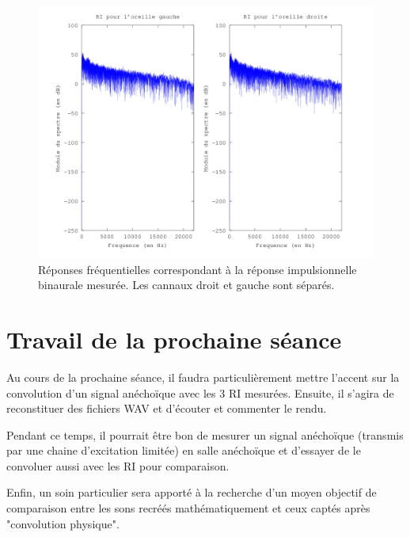 \documentclass[12pt]{article}
\begin{document}
\begin{figure}[h]
    \vfill\begin{center}
        \includegraphics[scale=0.6]{ri_binaurale.png}
    \end{center}\vfill
    \caption{\label{spectre2} Réponses fréquentielles correspondant à la réponse impulsionnelle binaurale mesurée. Les
    cannaux droit et gauche sont séparés.}
\end{figure}

\section{Travail de la prochaine séance} %

Au cours de la prochaine séance, il faudra particulièrement mettre l'accent sur la convolution d'un signal anéchoïque
avec les 3 RI mesurées. Ensuite, il s'agira de reconstituer des fichiers WAV et d'écouter et commenter le rendu.

Pendant ce temps, il pourrait être bon de mesurer un signal anéchoïque (transmis par une chaine d'excitation limitée) en
salle anéchoïque et d'essayer de le convoluer aussi avec les RI pour comparaison.

Enfin, un soin particulier sera apporté à la recherche d'un moyen objectif de comparaison entre les sons recréés
mathématiquement et ceux captés après "convolution physique".

\end{document}
